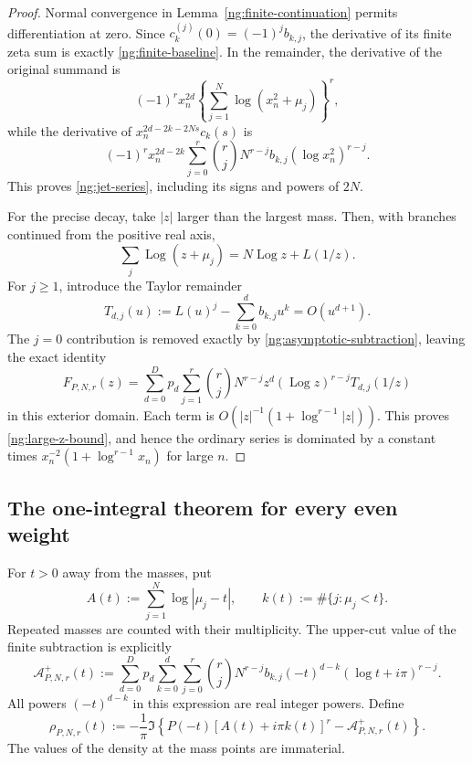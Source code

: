 \documentclass[11pt,letterpaper]{article}
\numberwithin{equation}{section}
\theoremstyle{definition}
\theoremstyle{remark}
\DeclareMathOperator{\Log}{Log}
\begin{document}
\begin{proof}
Normal convergence in Lemma~\ref{ng:finite-continuation}
permits differentiation at zero.  Since
$c_k^{(j)}(0)=(-1)^j b_{k,j}$, the derivative of its finite
zeta sum is exactly \eqref{ng:finite-baseline}.
In the remainder, the derivative of the original summand is
\[
 (-1)^r x_n^{2d}
       \left\{\sum_{j=1}^{N}\log(x_n^2+\mu_j)\right\}^{r},
\]
while the derivative of
$x_n^{2d-2k-2Ns}c_k(s)$ is
\[
 (-1)^r x_n^{2d-2k}\sum_{j=0}^{r}
             \binom{r}{j}N^{r-j}b_{k,j}(\log x_n^2)^{r-j}.
\]
This proves \eqref{ng:jet-series}, including its signs and
powers of $2N$.

For the precise decay, take $|z|$ larger than the largest mass.
Then, with branches continued from the positive real axis,
\[
 \sum_j\Log(z+\mu_j)=N\Log z+L(1/z).
\]
For $j\geq1$, introduce the Taylor remainder
\[
 T_{d,j}(u):=L(u)^j-\sum_{k=0}^{d}b_{k,j}u^k
                    =O(u^{d+1}).
\]
The $j=0$ contribution is removed exactly by
\eqref{ng:asymptotic-subtraction}, leaving the exact identity
\begin{equation}
 F_{P,N,r}(z)
 =\sum_{d=0}^{D}p_d\sum_{j=1}^{r}
       \binom{r}{j}N^{r-j}z^d(\Log z)^{r-j}T_{d,j}(1/z)
 \label{ng:tail-decomposition}
\end{equation}
in this exterior domain.  Each term is
$O(|z|^{-1}(1+\log^{r-1}|z|))$.
This proves \eqref{ng:large-z-bound}, and hence the ordinary
series is dominated by a constant times
$x_n^{-2}(1+\log^{r-1}x_n)$ for large $n$.
\end{proof}


\subsection{The one-integral theorem for every even weight}
\label{ng:integral-subsection}

For $t>0$ away from the masses, put
\begin{equation}
 A(t):=\sum_{j=1}^{N}\log|\mu_j-t|,\qquad
 k(t):=\#\{j:\mu_j<t\}.
 \label{ng:cut-data}
\end{equation}
Repeated masses are counted with their multiplicity.
The upper-cut value of the finite subtraction is explicitly
\begin{equation}
 \mathcal A_{P,N,r}^{+}(t)
 :=\sum_{d=0}^{D}p_d\sum_{k=0}^{d}\sum_{j=0}^{r}
       \binom{r}{j}N^{r-j}b_{k,j}
                 (-t)^{d-k}(\log t+i\pi)^{r-j}.
 \label{ng:upper-subtraction}
\end{equation}
All powers $(-t)^{d-k}$ in this expression are real integer
powers.  Define
\begin{equation}
 \rho_{P,N,r}(t)
 :=-\frac1\pi\Im\left\{
       P(-t)[A(t)+i\pi k(t)]^r
                    -\mathcal A_{P,N,r}^{+}(t)\right\}.
 \label{ng:density}
\end{equation}
The values of the density at the mass points are immaterial.
\end{document}
